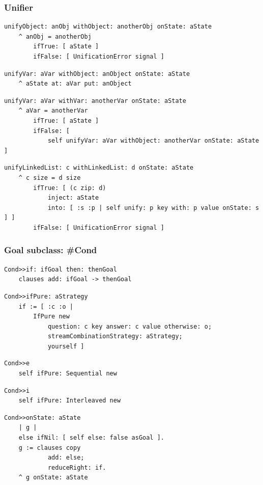 \documentclass[9pt]{beamer}
\begin{document}
\begin{frame}[fragile]
\frametitle{Unifier}
\begin{verbatim}
unifyObject: anObj withObject: anotherObj onState: aState
    ^ anObj = anotherObj
        ifTrue: [ aState ]
        ifFalse: [ UnificationError signal ]
\end{verbatim}
\begin{verbatim}
unifyVar: aVar withObject: anObject onState: aState
    ^ aState at: aVar put: anObject
\end{verbatim}
\begin{verbatim}
unifyVar: aVar withVar: anotherVar onState: aState
    ^ aVar = anotherVar
        ifTrue: [ aState ]
        ifFalse: [
            self unifyVar: aVar withObject: anotherVar onState: aState ]
\end{verbatim}
\begin{verbatim}
unifyLinkedList: c withLinkedList: d onState: aState
    ^ c size = d size
        ifTrue: [ (c zip: d)
            inject: aState
            into: [ :s :p | self unify: p key with: p value onState: s ] ]
        ifFalse: [ UnificationError signal ]
\end{verbatim}
\end{frame}


\begin{frame}[fragile]
\frametitle{Goal subclass: \#Cond}
\begin{verbatim}
Cond>>if: ifGoal then: thenGoal
    clauses add: ifGoal -> thenGoal
\end{verbatim}
\begin{verbatim}
Cond>>ifPure: aStrategy
    if := [ :c :o |
        IfPure new
            question: c key answer: c value otherwise: o;
            streamCombinationStrategy: aStrategy;
            yourself ]
\end{verbatim}
\begin{verbatim}
Cond>>e
    self ifPure: Sequential new
\end{verbatim}
\begin{verbatim}
Cond>>i
    self ifPure: Interleaved new
\end{verbatim}
\begin{verbatim}
Cond>>onState: aState
    | g |
    else ifNil: [ self else: false asGoal ].
    g := clauses copy
            add: else;
            reduceRight: if.
    ^ g onState: aState
\end{verbatim}
\end{frame}
\end{document}
